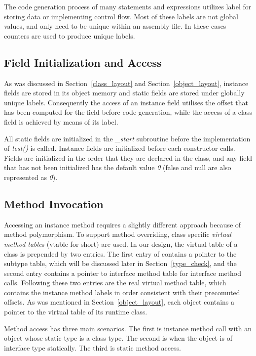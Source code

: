 \documentclass[a4paper, notitlepage]{report}
\begin{document}
The code generation process of many statements and expressions utilizes label for storing data or implementing control flow. Most of these labels are not global  values, and only need to be unique within an assembly file. In these cases counters are used to produce unique labels. 

\subsection{Field Initialization and Access}

As was discussed in Section~\ref{class_layout} and Section~\ref{object_layout}, instance fields are stored in its object memory and static fields are stored under globally unique labels. Consequently the access of an instance field utilises the offset that has been computed for the field before code generation, while the access of a class field is achieved by means of its label.

All static fields are initialized in the \emph{\_start} subroutine before the implementation of \emph{test()} is called. Instance fields are initialized before each constructor calls. Fields are initialized in the order that they are declared in the class, and any field that has not been initialized has the default value \emph{0} (false and null are also represented as \emph{0}).


\subsection{Method Invocation}
\label{method_invoke}

Accessing an instance method requires a slightly different approach because of method polymorphism. To support method overriding, class specific \emph{virtual method table}s (vtable for short) are used. In our design, the virtual table of a class is prepended by two entries. The first entry of contains a pointer to the subtype table, which will be discussed later in Section~\ref{type_check}, and the second entry contains a pointer to interface method table for interface method calls. Following these two entries are the real virtual method table, which contains the instance method labels in order consistent with their precomuted offsets. As was mentioned in Section~\ref{object_layout}, each object contains a pointer to the virtual table of its runtime class. 

Method access has three main scenarios. The first is instance method call with an object whose static type is a class type. The second is when the object is of interface type statically. The third is static method access.
\end{document}
